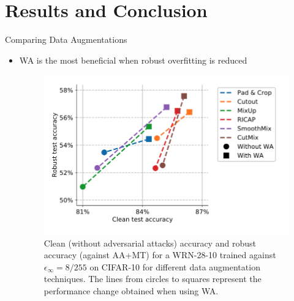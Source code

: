 \section{Results and Conclusion}

\begin{frame}{Comparing Data Augmentations}
    \begin{itemize}
        \item WA is the most beneficial when robust overfitting is reduced
        \begin{figure}
            \centering
            \includegraphics[height=.5\textheight]{pic/fig 4.png}
            \caption{Clean (without adversarial attacks) accuracy and robust accuracy (against AA+MT) for a WRN-28-10 trained against $\epsilon_\infty = 8/255$ on CIFAR-10 for different data augmentation techniques. The lines from circles to squares represent the performance change obtained when using WA.}
            \label{fig:fig4}
            \end{figure}
    \end{itemize}
\end{frame}

